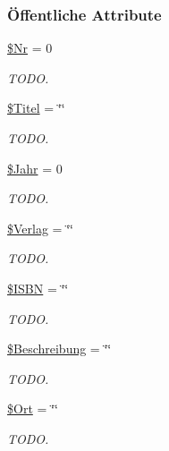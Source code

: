 \subsubsection*{\"{O}ffentliche Attribute}
\begin{CompactItemize}
\item 
\hyperlink{classLiteratur_036a682a93a5d50839c1ebc70a79d4b6}{\$Nr} = 0
\begin{CompactList}\small\item\em TODO. \item\end{CompactList}\item 
\hyperlink{classLiteratur_e30f9e9db9b396e6f87adfdb94e12ba0}{\$Titel} = \char`\"{}\char`\"{}
\begin{CompactList}\small\item\em TODO. \item\end{CompactList}\item 
\hyperlink{classLiteratur_2cb6f40a8757a0edd5da32385ad009c9}{\$Jahr} = 0
\begin{CompactList}\small\item\em TODO. \item\end{CompactList}\item 
\hyperlink{classLiteratur_5f591208e5d21bb81e6c51484e2a60e0}{\$Verlag} = \char`\"{}\char`\"{}
\begin{CompactList}\small\item\em TODO. \item\end{CompactList}\item 
\hyperlink{classLiteratur_9e3b00766297a68adac423980767dd3c}{\$ISBN} = \char`\"{}\char`\"{}
\begin{CompactList}\small\item\em TODO. \item\end{CompactList}\item 
\hyperlink{classLiteratur_6769ff8b353d2f789125f009b4dcfdc0}{\$Beschreibung} = \char`\"{}\char`\"{}
\begin{CompactList}\small\item\em TODO. \item\end{CompactList}\item 
\hyperlink{classLiteratur_da6c458bb229187efea8e8f144a1d279}{\$Ort} = \char`\"{}\char`\"{}
\begin{CompactList}\small\item\em TODO. \item\end{CompactList}\item 

\end{CompactItemize}
